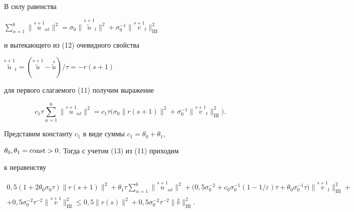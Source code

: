 В силу равенства


$\sum\limits_{\alpha=1}^6\|\overset{s+1}{u}_{\!\!\!\alpha t}\|^2=


\sigma_0\|\overset{s+1}{\tilde u}_{\!\!\!t}\|^2+\sigma_0^{-1}


\|\overset{s+1}{v}_{\!\!\!t}\big\|_{\mathrm{III}}^2$


и вытекающего из (12) очевидного свойства


$\overset{s+1}{\tilde u}_{\!\!\!t}=


(\overset{s+1}{\tilde u}-\overset{s}{\tilde u})/\tau=-r(s+1)$


для первого слагаемого (11) получим выражение


\begin{equation}


c_1\tau\sum_{\alpha=1}^6\|\overset{s+1}{u}_{\!\!\!\alpha t}\|^2=


c_1\tau\bigl(\sigma_0\|r(s+1)\|^2+\sigma_0^{-1}


\|\overset{s+1}{v}_{\!\!\!t}\big\|_{\mathrm{III}}^2\bigr).


\end{equation}





Представим константу $c_1$ в виде суммы $c_1=\theta_0+\theta_1$,


$\theta_0,\theta_1=\operatorname{const}>0$. Тогда с учетом (13) из (11) приходим


к неравенству


\begin{multline}


0,5(1+2\theta_0\sigma_0\tau)\|r(s+1)\|^2+


\theta_1\tau\sum_{\alpha=1}^6\|\overset{s+1}{u}_{\!\!\!\alpha t}\|^2+


\bigl(0,5\sigma_0^{-2}+c_0\sigma_0^{-1}(1-1/\varepsilon)\tau


+\theta_0\sigma_0^{-1}\tau\bigr)


\|\overset{s+1}{v}_{\!\!\!t}\big\|_{\mathrm{III}}^2+ \\


%


+0,5\sigma_0^{-2}\tau^{-2}\|\overset{s+1}{v}\big\|_{\mathrm{III}}^2\leq


0,5\|r(s)\|^2+0,5\sigma_0^{-2}\tau^{-2}


\|\overset{s}{v}\big\|_{\mathrm{III}}^2.


\end{multline}


